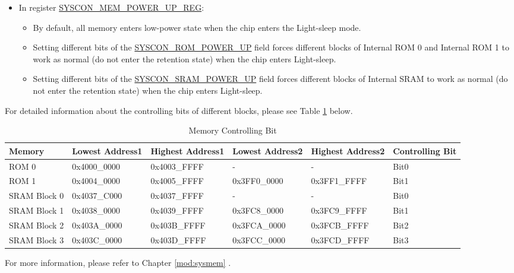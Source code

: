 \documentclass[main\_\_EN.tex]{subfiles}
\begin{document}
\begin{itemize}
\begin{itemize}
    \end{itemize}
    \item In register \hyperref[regdesc:SYSCONMEMPOWERUPREG]{SYSCON\_MEM\_POWER\_UP\_REG}:
    \begin{itemize}
        \item By default, all memory enters low-power state when the chip enters the Light-sleep mode.
        \item Setting different bits of the \hyperref[fielddesc:SYSCONROMPOWERUP]{SYSCON\_ROM\_POWER\_UP} field forces different blocks of Internal ROM 0 and Internal ROM 1 to work as normal (do not enter the retention state) when the chip enters Light-sleep.
        \item Setting different bits of the \hyperref[fielddesc:SYSCONSRAMPOWERUP]{SYSCON\_SRAM\_POWER\_UP} field forces different blocks of Internal SRAM to work as normal (do not enter the retention state) when the chip enters Light-sleep.
    \end{itemize}
\end{itemize}

For detailed information about the controlling bits of different blocks, please see Table \ref{tab:sysreg-mem-controlling-bit} below.

\begin{longtable}[c]{| l | l | l |l | l | l |}
\caption{Memory Controlling Bit}
\label{tab:sysreg-mem-controlling-bit}
\\\hline
\rowcolor{lightgray}
        Memory & Lowest Address1 & Highest Address1 & Lowest Address2 & Highest Address2 & Controlling Bit \\ \hline
        ROM 0  & 0x4000\_0000    & 0x4003\_FFFF  &- & -  & Bit0 \\\hline
        ROM 1  & 0x4004\_0000    & 0x4005\_FFFF  & 0x3FF0\_0000  & 0x3FF1\_FFFF & Bit1\\\hline
        SRAM Block 0  & 0x4037\_C000    & 0x4037\_FFFF  & - & -  & Bit0 \\\hline
        SRAM Block 1  & 0x4038\_0000    & 0x4039\_FFFF  & 0x3FC8\_0000  & 0x3FC9\_FFFF & Bit1\\\hline
        SRAM Block 2  & 0x403A\_0000    & 0x403B\_FFFF  & 0x3FCA\_0000  & 0x3FCB\_FFFF & Bit2\\\hline
        SRAM Block 3  & 0x403C\_0000    & 0x403D\_FFFF  & 0x3FCC\_0000  & 0x3FCD\_FFFF & Bit3\\\hline
\end{longtable}

For more information, please refer to Chapter \ref{mod:sysmem} \textit{}.
\end{document}
